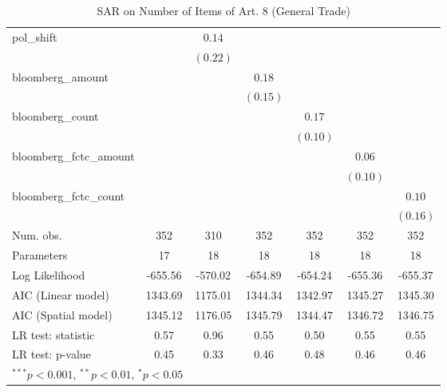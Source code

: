 \begin{table}[!h]
\begin{center}
\begin{tabular}{l c c c c c c }
pol\_shift              &              & $0.14$       &              &              &              &              \\
                        &              & $(0.22)$     &              &              &              &              \\
bloomberg\_amount       &              &              & $0.18$       &              &              &              \\
                        &              &              & $(0.15)$     &              &              &              \\
bloomberg\_count        &              &              &              & $0.17$       &              &              \\
                        &              &              &              & $(0.10)$     &              &              \\
bloomberg\_fctc\_amount &              &              &              &              & $0.06$       &              \\
                        &              &              &              &              & $(0.10)$     &              \\
bloomberg\_fctc\_count  &              &              &              &              &              & $0.10$       \\
                        &              &              &              &              &              & $(0.16)$     \\
\midrule
Num. obs.               & 352          & 310          & 352          & 352          & 352          & 352          \\
Parameters              & 17           & 18           & 18           & 18           & 18           & 18           \\
Log Likelihood          & -655.56      & -570.02      & -654.89      & -654.24      & -655.36      & -655.37      \\
AIC (Linear model)      & 1343.69      & 1175.01      & 1344.34      & 1342.97      & 1345.27      & 1345.30      \\
AIC (Spatial model)     & 1345.12      & 1176.05      & 1345.79      & 1344.47      & 1346.72      & 1346.75      \\
LR test: statistic      & 0.57         & 0.96         & 0.55         & 0.50         & 0.55         & 0.55         \\
LR test: p-value        & 0.45         & 0.33         & 0.46         & 0.48         & 0.46         & 0.46         \\
\bottomrule
\multicolumn{7}{l}{\scriptsize{$^{***}p<0.001$, $^{**}p<0.01$, $^*p<0.05$}}
\end{tabular}
\caption{SAR on Number of Items of Art. 8 (General Trade)}
\label{table:coefficients}
\end{center}
\end{table}
